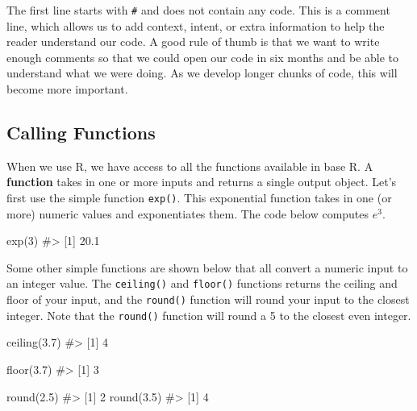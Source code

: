 \documentclass[
  letterpaper,
]{krantz}
\makeatletter
\newenvironment{Shaded}{\begin{snugshade}}{\end{snugshade}}
\newcommand{\CommentTok}[1]{\textcolor[rgb]{0.37,0.37,0.37}{#1}}
\newcommand{\DecValTok}[1]{\textcolor[rgb]{0.68,0.00,0.00}{#1}}
\newcommand{\FloatTok}[1]{\textcolor[rgb]{0.68,0.00,0.00}{#1}}
\newcommand{\FunctionTok}[1]{\textcolor[rgb]{0.28,0.35,0.67}{#1}}
\newcommand{\NormalTok}[1]{\textcolor[rgb]{0.00,0.23,0.31}{#1}}
\newenvironment{kframe}{%
\medskip{}
\setlength{\fboxsep}{.8em}
 \def\at@end@of@kframe{}%
 \ifinner\ifhmode%
  \def\at@end@of@kframe{\end{minipage}}%
  \begin{minipage}{\columnwidth}%
 \fi\fi%
 \def\FrameCommand##1{\hskip\@totalleftmargin \hskip-\fboxsep
 \colorbox{shadecolor}{##1}\hskip-\fboxsep
     \hskip-\linewidth \hskip-\@totalleftmargin \hskip\columnwidth}%
 \MakeFramed {\advance\hsize-\width
   \@totalleftmargin\z@ \linewidth\hsize
   \@setminipage}}%
 {\par\unskip\endMakeFramed%
 \at@end@of@kframe}
\renewenvironment{Shaded}{\begin{kframe}}{\end{kframe}}
\makeatother
\begin{document}
The first line starts with \texttt{\#} and does not contain any code.
This is a comment line, which allows us to add context, intent, or extra
information to help the reader understand our code. A good rule of thumb
is that we want to write enough comments so that we could open our code
in six months and be able to understand what we were doing. As we
develop longer chunks of code, this will become more important.

\subsection{Calling Functions}\label{calling-functions}

When we use R, we have access to all the functions available in base R.
A \textbf{function} takes in one or more inputs and returns a single
output object. Let's first use the simple function \texttt{exp()}. This
exponential function takes in one (or more) numeric values and
exponentiates them. The code below computes \(e^3\).

\begin{Shaded}
\begin{Highlighting}[]
\FunctionTok{exp}\NormalTok{(}\DecValTok{3}\NormalTok{)}
\CommentTok{\#\textgreater{} [1] 20.1}
\end{Highlighting}
\end{Shaded}

Some other simple functions are shown below that all convert a numeric
input to an integer value. The \texttt{ceiling()} and \texttt{floor()}
functions returns the ceiling and floor of your input, and the
\texttt{round()} function will round your input to the closest integer.
Note that the \texttt{round()} function will round a 5 to the closest
even integer.

\begin{Shaded}
\begin{Highlighting}[]
\FunctionTok{ceiling}\NormalTok{(}\FloatTok{3.7}\NormalTok{)}
\CommentTok{\#\textgreater{} [1] 4}
\end{Highlighting}
\end{Shaded}

\begin{Shaded}
\begin{Highlighting}[]
\FunctionTok{floor}\NormalTok{(}\FloatTok{3.7}\NormalTok{)}
\CommentTok{\#\textgreater{} [1] 3}
\end{Highlighting}
\end{Shaded}

\begin{Shaded}
\begin{Highlighting}[]
\FunctionTok{round}\NormalTok{(}\FloatTok{2.5}\NormalTok{)}
\CommentTok{\#\textgreater{} [1] 2}
\FunctionTok{round}\NormalTok{(}\FloatTok{3.5}\NormalTok{)}
\CommentTok{\#\textgreater{} [1] 4}
\end{Highlighting}
\end{Shaded}
\end{document}
